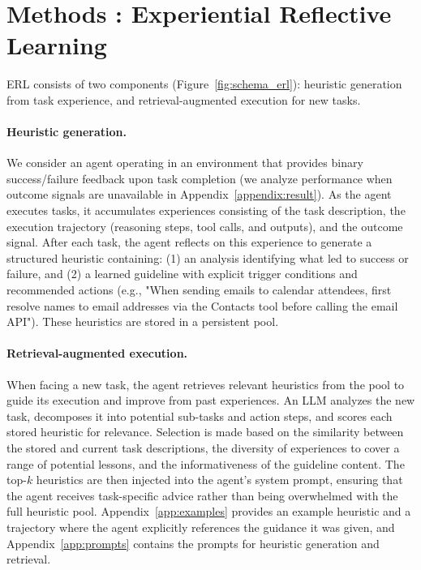 \documentclass{article}
\begin{document}
\section{Methods : Experiential Reflective Learning}

ERL consists of two components (Figure~\ref{fig:schema_erl}): heuristic generation from task experience, and retrieval-augmented execution for new tasks.

\paragraph{Heuristic generation.}
We consider an agent operating in an environment that provides binary success/failure feedback upon task completion (we analyze performance when outcome signals are unavailable in Appendix~\ref{appendix:result}). As the agent executes tasks, it accumulates experiences consisting of the task description, the execution trajectory (reasoning steps, tool calls, and outputs), and the outcome signal. After each task, the agent reflects on this experience to generate a structured heuristic containing: (1) an analysis identifying what led to success or failure, and (2) a learned guideline with explicit trigger conditions and recommended actions (e.g., "When sending emails to calendar attendees, first resolve names to email addresses via the Contacts tool before calling the email API"). These heuristics are stored in a persistent pool.

\paragraph{Retrieval-augmented execution.}
When facing a new task, the agent retrieves relevant heuristics from the pool to guide its execution and improve from past experiences. An LLM analyzes the new task, decomposes it into potential sub-tasks and action steps, and scores each stored heuristic for relevance. Selection is made based on the similarity between the stored and current task descriptions, the diversity of experiences to cover a range of potential lessons, and the informativeness of the guideline content. The top-$k$ heuristics are then injected into the agent's system prompt, ensuring that the agent receives task-specific advice rather than being overwhelmed with the full heuristic pool. Appendix~\ref{app:examples} provides an example heuristic and a trajectory where the agent explicitly references the guidance it was given, and Appendix~\ref{app:prompts} contains the prompts for heuristic generation and retrieval.
\end{document}
